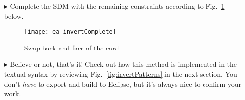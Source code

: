 \begin{itemize}
\vspace*{0.5cm}

\item[$\blacktriangleright$] Complete the SDM with the remaining constraints according to Fig.~\ref{fig:sdm_invertComplete} below.

\vspace{0.5cm}

\begin{figure}[htbp]
\begin{center}
  \texttt{[image: ea\_invertComplete]}
  \caption{Swap back and face of the card}  
  \label{fig:sdm_invertComplete}
\end{center}
\end{figure}

\vspace{0.5cm}

\item[$\blacktriangleright$] Believe or not, that's it! Check out how this method is implemented in the textual syntax by reviewing
Fig.~\ref{fig:invertPatterns} in the next section. You don't \emph{have} to export and build to Eclipse, but it's always nice to confirm your work.


\end{itemize}
